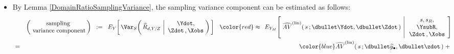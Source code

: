 \begin{itemize}
\begin{eqnarray*}
            \,\right\vert\,
            s,s_{R},\Zdot\,,\Xobs
            \,\right]
            \,\right]
    \\ \\
    \left(\begin{array}{c}
        \textnormal{sampling-nonresponse}
        \\
        \textnormal{covariance}
        \end{array}\right)
    & := &
        2\cdot
        E_{SR}\!\left[\,
        E_{Y}\!\left[\,
            \left.
            (\,\widetilde{R}_{d,Y/Z} \,-\, \widehat{R}_{d,Y/Z}\,)(\,\widehat{R}_{d,Y/Z} \,-\, R_{d,Y/Z}\,)
            \,\right\vert\,
            s,s_{R},\Zdot\,,\Xobs
            \,\right]
            \,\right]
    \end{eqnarray*}
\item
    By Lemma \ref{DomainRatioSamplingVariance},
    the sampling variance component can be estimated
    as follows:
    \begin{eqnarray*}
    &&
        \left(\!\begin{array}{c}
            \textnormal{sampling}
            \\
            \textnormal{variance component}
            \!\!\end{array}\right)
    \;\; := \;\;
        E_{Y}\!\left[\,
        \Var_{S}\!\left(\,
            \widehat{R}_{d,Y/Z}
            \,\left\vert
            \begin{array}{c} \Ydot, \\ \Zdot\,,\Xobs \end{array}
            \right.
            \!\!\right)
            \,\right]
    \;\;\, {\color{red}\approx} \;\;\,
        E_{Y_{M}}\!\left[\;
            \widehat{AV}^{\textnormal{(lin)}}(\,s\,;\dbullet\Ydot,\dbullet\Zdot\,)
            \,\left\vert\,
            \begin{array}{c}
                s,s_{R},\\
                \YsubR,\\
                \Zdot\,,\Xobs
                \end{array}
            \right.
            \!\right]
    \\
    & = &
        {\color{blue}
        \widehat{AV}^{\textnormal{(lin)}}(\,s\,;\dbullet\widetilde{y}_{\bullet},\dbullet\zdot\,)
        \; + \;
}
\end{eqnarray*}
\end{itemize}
